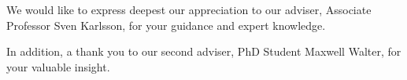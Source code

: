 We would like to express deepest our appreciation to our adviser, Associate
Professor Sven Karlsson, for your guidance and expert knowledge.

In addition, a thank you to our second adviser, PhD Student Maxwell Walter, for
your valuable insight.

